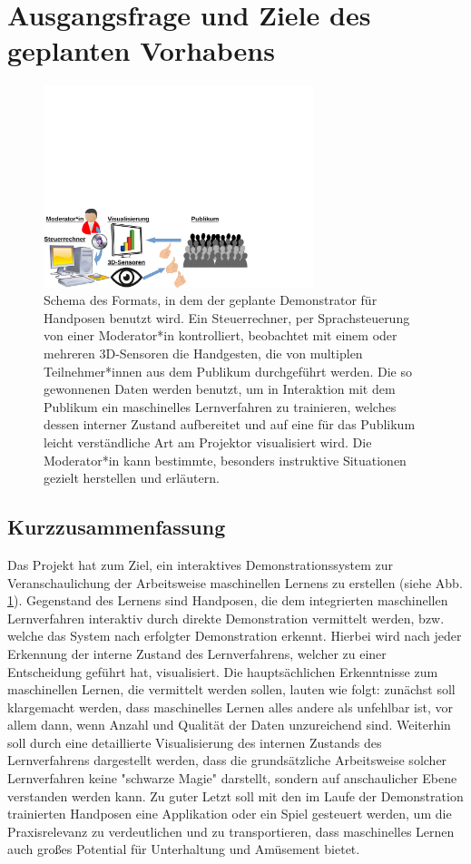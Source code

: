 \documentclass[11pt]{article}
\begin{document}
\section{Ausgangsfrage und Ziele des geplanten Vorhabens}
%
\begin{figure}[t!]
\centering
\includegraphics[viewport=0in 0in 7.8in 3.5in,width=0.7\textwidth,clip]{setup.pdf}
\caption{\label{fig:setup}
Schema des Formats, in dem der geplante Demonstrator für Handposen benutzt wird. Ein Steuerrechner, per Sprachsteuerung von einer Moderator*in kontrolliert, beobachtet mit einem oder mehreren 3D-Sensoren die Handgesten, die von multiplen Teilnehmer*innen aus dem Publikum durchgeführt werden. Die so gewonnenen Daten werden benutzt, um in Interaktion mit dem Publikum ein maschinelles Lernverfahren zu trainieren, welches dessen interner Zustand aufbereitet und auf eine für das Publikum leicht verständliche Art am Projektor visualisiert wird. Die Moderator*in kann bestimmte, besonders instruktive Situationen gezielt herstellen und erläutern.
}
\end{figure}
\subsection{Kurzzusammenfassung}
Das Projekt hat zum Ziel, ein interaktives Demonstrationssystem zur Veranschaulichung der Arbeitsweise maschinellen Lernens zu erstellen (siehe Abb. \ref{fig:setup}).
Gegenstand des Lernens sind Handposen, die dem integrierten maschinellen Lernverfahren interaktiv durch direkte Demonstration vermittelt werden, bzw. welche das System nach
erfolgter Demonstration erkennt.  Hierbei wird nach jeder Erkennung der interne Zustand des Lernverfahrens, welcher zu einer Entscheidung geführt hat, visualisiert.
Die hauptsächlichen Erkenntnisse zum maschinellen Lernen, die vermittelt werden sollen, lauten wie folgt: zunächst soll klargemacht werden, dass maschinelles Lernen alles andere als unfehlbar ist, vor allem dann, wenn Anzahl und Qualität der Daten unzureichend sind. Weiterhin soll durch eine detaillierte Visualisierung des internen Zustands des Lernverfahrens dargestellt werden, dass die grundsätzliche Arbeitsweise solcher Lernverfahren keine "schwarze Magie" darstellt, sondern auf anschaulicher Ebene  verstanden werden kann.
Zu guter Letzt soll mit den im Laufe der Demonstration trainierten Handposen eine Applikation oder ein Spiel gesteuert werden, um die Praxisrelevanz zu verdeutlichen und zu transportieren, dass maschinelles Lernen auch großes Potential für Unterhaltung und Amüsement bietet.
%
\end{document}
